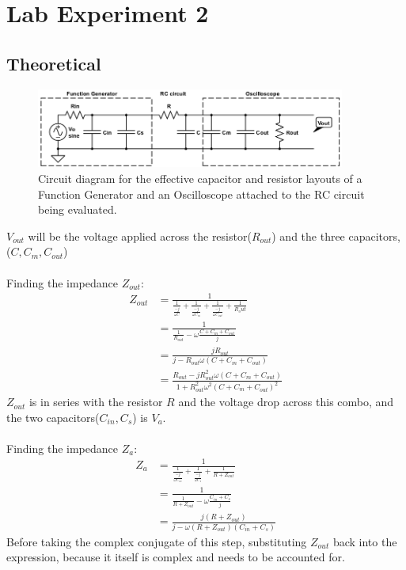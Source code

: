 \documentclass[a4paper,12pt]{article}
\newcommand{\F}[2]{\ensuremath{\frac{#1}{#2}}}
\begin{document}
\section*{Lab Experiment 2}
\subsection*{Theoretical}
\begin{figure}[h]
\centering
\includegraphics[width=4in]{sam_lab2/effective_rc_circuit.png}
\caption{Circuit diagram for the effective capacitor and resistor layouts of a Function Generator and an Oscilloscope attached to the RC circuit being evaluated.}
\end{figure}
\noindent
$V_{out}$ will be the voltage applied across the resistor($R_{out}$) and the three capacitors, ($C,C_{m},C_{out}$)\\
\\
Finding the impedance $Z_{out}$:
\begin{align*}
Z_{out}&=\F{1}{\F{1}{\F{-j}{\omega C}}+\F{1}{\F{-j}{\omega C_m}}+\F{1}{\F{-j}{\omega C_{out}}}+\F{1}{R_out}}\\
&=\F{1}{\F{1}{R_{out}}-\omega\F{C+C_m+C_{out}}{j}}\\
&=\F{jR_{out}}{j-R_{out}\omega(C+C_m+C_{out})}\\
&=\F{R_{out}-jR_{out}^2\omega(C+C_m+C_{out})}{1+R_{out}^2\omega^2(C+C_m+C_{out})^2}
\end{align*}
$Z_{out}$ is in series with the resistor $R$ and the voltage drop across this combo, and the two capacitors($C_{in}, C_s$) is $V_a$.\\
\\
Finding the impedance $Z_a$:
\begin{align*}
Z_a&=\F{1}{\F{1}{\F{-j}{\omega C_{in}}}+\F{1}{\F{-j}{\omega C_s}}+\F{1}{R+Z_{out}}}\\
&=\F{1}{\F{1}{R+Z_{out}}-\omega\F{C_{in}+C_s}{j}}\\
&=\F{j(R+Z_{out})}{j-\omega(R+Z_{out})(C_{in}+C_s)}
\end{align*}
Before taking the complex conjugate of this step, substituting $Z_{out}$ back into the expression, because it itself is complex and needs to be accounted for.\\
\end{document}
